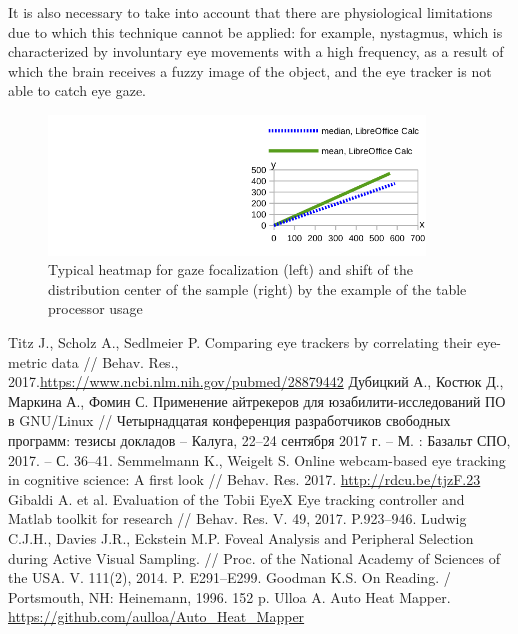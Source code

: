 \documentclass[10pt, a5paper]{article}
\begin{document}
It is also necessary to take into account that there are physiological limitations due to which this technique cannot be applied: for example, nystagmus, which is characterized by involuntary eye movements with a high frequency, as a result of which the brain receives a fuzzy image of the object, and the eye tracker is not able to catch eye gaze.

\begin{center}
\begin{figure}[h!]
  \centering
  \includegraphics[width=10cm]{Markina2}
  \caption{Typical heatmap for gaze focalization (left) and shift of the distribution center of the sample (right) by the example of the table processor usage}	
  \label{markina:fig2}
\end{figure}
\end{center}


\begin{thebibliography}{9}
 Titz J., Scholz A., Sedlmeier P. Comparing eye trackers by correlating their eye-metric data // Behav. Res., 2017.\url{https://www.ncbi.nlm.nih.gov/pubmed/28879442}
 Дубицкий А., Костюк Д., Маркина А., Фомин С. Применение айтрекеров для юзабилити-исследований ПО в GNU/Linux // Четырнадцатая конференция разработчиков свободных программ: тезисы докладов – Калуга, 22–24 сентября 2017 г. – М. : Базальт СПО, 2017. – С. 36–41.
 Semmelmann K., Weigelt S. Online webcam-based eye tracking in cognitive science: A first look // Behav. Res. 2017. \url{http://rdcu.be/tjzF.23}
 Gibaldi A. et al. Evaluation of the Tobii EyeX Eye tracking controller and Matlab toolkit for research // Behav. Res. V. 49, 2017. P.923–946.
 Ludwig C.J.H., Davies J.R., Eckstein M.P. Foveal Analysis and Peripheral Selection during Active Visual Sampling. // Proc. of the National Academy of Sciences of the USA. V. 111(2), 2014. P. E291–E299.
 Goodman K.S. On Reading. / Portsmouth, NH: Heinemann, 1996. 152 p.
 Ulloa A. Auto Heat Mapper. \url{https://github.com/aulloa/Auto_Heat_Mapper}
\end{thebibliography}
\end{document}
